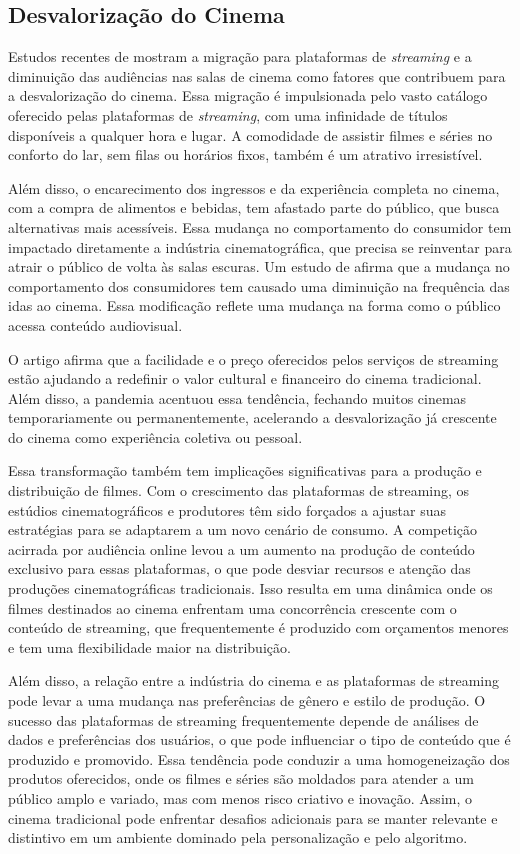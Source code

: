 \documentclass[
	article,			%
	12pt,				%
	oneside,			%
	a4paper,			%
	english,			%
	brazil,				%
	sumario=tradicional
	]{abntex2}
\begin{document}
\subsection{Desvalorização do Cinema}
Estudos recentes de  mostram a migração para plataformas de \textit{streaming} e a diminuição das audiências nas salas de cinema como fatores que contribuem para a desvalorização do cinema. Essa migração é impulsionada pelo vasto catálogo oferecido pelas plataformas de \textit{streaming}, com uma infinidade de títulos disponíveis a qualquer hora e lugar. A comodidade de assistir filmes e séries no conforto do lar, sem filas ou horários fixos, também é um atrativo irresistível. 

Além disso, o encarecimento dos ingressos e da experiência completa no cinema, com a compra de alimentos e bebidas, tem afastado parte do público, que busca alternativas mais acessíveis. Essa mudança no comportamento do consumidor tem impactado diretamente a indústria cinematográfica, que precisa se reinventar para atrair o público de volta às salas escuras. Um estudo de  afirma que a mudança no comportamento dos consumidores tem causado uma diminuição na frequência das idas ao cinema. Essa modificação reflete uma mudança na forma como o público acessa conteúdo audiovisual. 


O artigo afirma que a facilidade e o preço oferecidos pelos serviços de streaming estão ajudando a redefinir o valor cultural e financeiro do cinema tradicional. Além disso, a pandemia acentuou essa tendência, fechando muitos cinemas temporariamente ou permanentemente, acelerando a desvalorização já crescente do cinema como experiência coletiva ou pessoal.

Essa transformação também tem implicações significativas para a produção e distribuição de filmes. Com o crescimento das plataformas de streaming, os estúdios cinematográficos e produtores têm sido forçados a ajustar suas estratégias para se adaptarem a um novo cenário de consumo. A competição acirrada por audiência online levou a um aumento na produção de conteúdo exclusivo para essas plataformas, o que pode desviar recursos e atenção das produções cinematográficas tradicionais. Isso resulta em uma dinâmica onde os filmes destinados ao cinema enfrentam uma concorrência crescente com o conteúdo de streaming, que frequentemente é produzido com orçamentos menores e tem uma flexibilidade maior na distribuição.

Além disso, a relação entre a indústria do cinema e as plataformas de streaming pode levar a uma mudança nas preferências de gênero e estilo de produção. O sucesso das plataformas de streaming frequentemente depende de análises de dados e preferências dos usuários, o que pode influenciar o tipo de conteúdo que é produzido e promovido. Essa tendência pode conduzir a uma homogeneização dos produtos oferecidos, onde os filmes e séries são moldados para atender a um público amplo e variado, mas com menos risco criativo e inovação. Assim, o cinema tradicional pode enfrentar desafios adicionais para se manter relevante e distintivo em um ambiente dominado pela personalização e pelo algoritmo.
\end{document}
